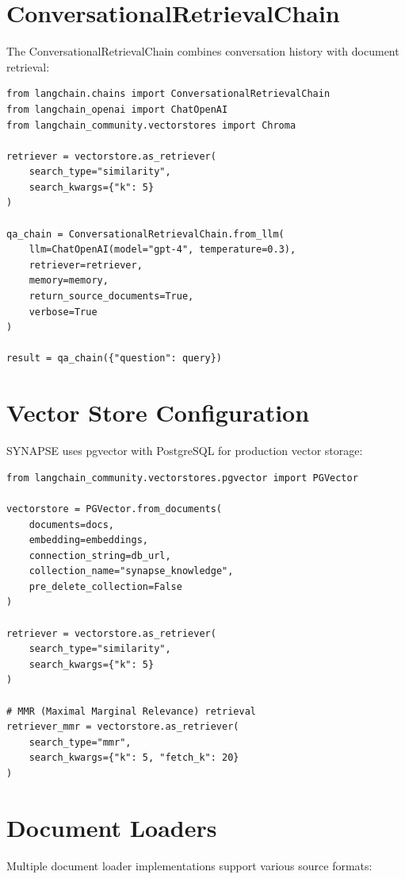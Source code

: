 \documentclass{report}
\begin{document}
\section{ConversationalRetrievalChain}

The ConversationalRetrievalChain combines conversation history with document retrieval:

\begin{lstlisting}
from langchain.chains import ConversationalRetrievalChain
from langchain_openai import ChatOpenAI
from langchain_community.vectorstores import Chroma

retriever = vectorstore.as_retriever(
    search_type="similarity",
    search_kwargs={"k": 5}
)

qa_chain = ConversationalRetrievalChain.from_llm(
    llm=ChatOpenAI(model="gpt-4", temperature=0.3),
    retriever=retriever,
    memory=memory,
    return_source_documents=True,
    verbose=True
)

result = qa_chain({"question": query})
\end{lstlisting}

\section{Vector Store Configuration}

SYNAPSE uses pgvector with PostgreSQL for production vector storage:

\begin{lstlisting}
from langchain_community.vectorstores.pgvector import PGVector

vectorstore = PGVector.from_documents(
    documents=docs,
    embedding=embeddings,
    connection_string=db_url,
    collection_name="synapse_knowledge",
    pre_delete_collection=False
)

retriever = vectorstore.as_retriever(
    search_type="similarity",
    search_kwargs={"k": 5}
)

# MMR (Maximal Marginal Relevance) retrieval
retriever_mmr = vectorstore.as_retriever(
    search_type="mmr",
    search_kwargs={"k": 5, "fetch_k": 20}
)
\end{lstlisting}

\section{Document Loaders}

Multiple document loader implementations support various source formats:
\end{document}
